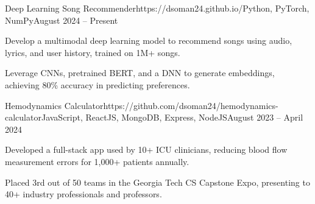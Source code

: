 \documentclass{article}
\begin{document}
\begin{flushleft}

    \vspace{3pt}

    \begin{project}{Deep Learning Song Recommender}{https://dsoman24.github.io/}{Python, PyTorch, NumPy}{August 2024 -- Present}
        \item Develop a multimodal deep learning model to recommend songs using audio, lyrics, and user history, trained on 1M+ songs.
        \item Leverage CNNs, pretrained BERT, and a DNN to generate embeddings, achieving 80\% accuracy in predicting preferences.
    \end{project}

    \begin{project}{Hemodynamics Calculator}{https://github.com/dsoman24/hemodynamics-calculator}{JavaScript, ReactJS, MongoDB, Express, NodeJS}{August 2023 -- April 2024}
        \item Developed a full-stack app used by 10+ ICU clinicians, reducing blood flow measurement errors for 1,000+ patients annually.
        \item Placed 3rd out of 50 teams in the Georgia Tech CS Capstone Expo, presenting to 40+ industry professionals and professors.
    \end{project}




    \vspace{3pt}
     \\
     \\
     \\

\end{flushleft}
\end{document}
